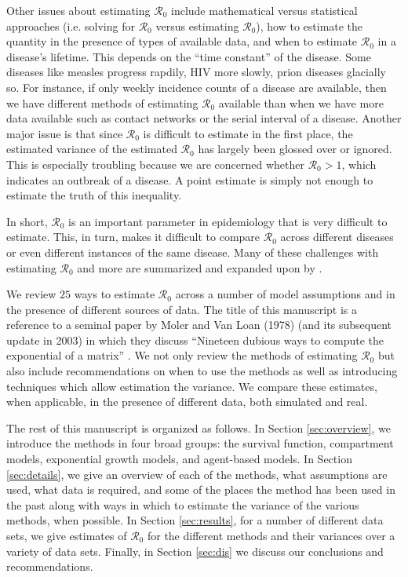 \documentclass[12pt]{article}
\newcommand{\XX}{\ensuremath{25}} %
\newcommand{\rr}{\ensuremath{\mathcal{R}_0}}
\begin{document}
Other issues about estimating $\rr$ include mathematical versus statistical approaches (i.e. solving for $\rr$ versus estimating $\rr$), how to estimate the quantity in the presence of types of available data, and when to estimate $\rr$ in a disease's lifetime.  This depends on the ``time constant'' of the disease.  Some diseases like measles progress rapdily, HIV more slowly, prion diseases glacially so.  For instance, if only weekly incidence counts of a disease are available, then we have different methods of estimating $\rr$ available than when we have more data available such as contact networks or the serial interval of a disease.  Another major issue is that since $\rr$ is difficult to estimate in the first place, the estimated variance of the estimated $\rr$ has largely been glossed over or  ignored.  This is especially troubling because we are concerned whether $\rr > 1$, which indicates an outbreak of a disease.  A point estimate is simply not enough to estimate the truth of this inequality.

In short, $\rr$ is an important parameter in epidemiology that is very difficult to estimate.  This, in turn, makes it difficult to compare $\rr$ across different diseases or even different instances of the same disease.  Many of these challenges with estimating $\rr$ and more are summarized and expanded upon by \cite{li2011}.

We review $\XX$ ways to estimate $\rr$ across a number of model assumptions and in the presence of different sources of data.  The title of this manuscript is a reference to a seminal paper by Moler and Van Loan (1978) (and its subsequent update in 2003) in which they discuss ``Nineteen dubious ways to compute the exponential of a matrix'' \citep{moler2003}.  We not only review the methods of estimating  $\rr$ but also include recommendations on when to use the methods as well as introducing techniques which allow estimation the variance.  We compare these estimates, when applicable, in the presence of different data, both simulated and real.

The rest of this manuscript is organized as follows.  In Section \ref{sec:overview}, we introduce the methods in four broad groups: the survival function, compartment models, exponential growth models, and agent-based models.    In Section \ref{sec:details}, we give an overview of each of the methods, what assumptions are used, what data is required, and some of the places the method has been used in the past along with ways in which to estimate the variance of the various methods, when possible.  In Section \ref{sec:results}, for a number of different data sets, we give estimates of $\rr$ for the different methods and their variances over a variety of data sets.  Finally, in Section \ref{sec:dis} we discuss our conclusions and recommendations.  
\end{document}

